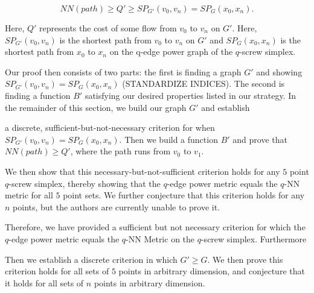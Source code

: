 $$NN(path) \geq Q' \geq SP_{G'}(v_0, v_n) = SP_{G}(x_0, x_n).$$

Here, $Q'$ represents the cost of some flow from $v_0$ to $v_n$ on $G'$. Here,
$SP_{G'}(v_0, v_n)$ is the shortest path from $v_0$ to $v_n$ on $G'$ and
$SP_G(x_0, x_n)$ is the shortest path from $x_0$ to $x_n$ on the q-edge power
graph of the $q$-screw simplex.

Our proof then consists of two parts: the first is finding a graph $G'$ and
showing $SP_{G'}(v_0, v_n) = SP_G(x_0, x_n)$ (STANDARDIZE INDICES). The second
is finding a function $B'$ satisfying our desired properties listed in our
strategy. In the remainder of this section, we build our graph $G'$ and
establish

a discrete, sufficient-but-not-necessary criterion for when $SP_{G'}(v_0, v_n)
= SP_G(x_0, x_n)$. Then we build a function $B'$ and prove that $NN(path) \geq
Q'$, where the path runs from $v_0$ to $v_1$.

We then show that this necessary-but-not-sufficient criterion holds for any $5$
point $q$-screw simplex, thereby showing that the $q$-edge power metric equals
the $q$-NN metric for all $5$ point sets. We further conjecture that this
criterion holds for any $n$ points, but the authors are currently unable to
prove it.

Therefore, we have provided a sufficient but not necessary criterion for which
the $q$-edge power metric equals the $q$-NN Metric on the $q$-screw simplex.
Furthermore

Then we establish a discrete criterion in which $G' \geq G$. We then prove this
criterion holds for all sets of $5$ points in arbitrary dimension, and
conjecture that it holds for all sets of $n$ points in arbitrary dimension.

